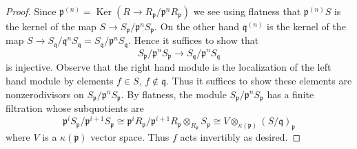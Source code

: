 \documentclass[10pt,a4paper]{amsart}
\theoremstyle{plain}
\theoremstyle{definition}
\theoremstyle{remark}
\numberwithin{equation}{subsection}
\def\Ker{\mathop{\mathrm{Ker}}}
\begin{document}
\begin{proof}
Since
$\mathfrak p^{(n)} = \Ker(R \to R_\mathfrak p/\mathfrak p^nR_\mathfrak p)$
we see using flatness that $\mathfrak p^{(n)} S$ is the kernel of the map
$S \to S_\mathfrak p/\mathfrak p^nS_\mathfrak p$. On the other hand
$\mathfrak q^{(n)}$ is the kernel of the map
$S \to S_\mathfrak q/\mathfrak q^nS_\mathfrak q =
S_\mathfrak q/\mathfrak p^nS_\mathfrak q$. Hence it suffices
to show that
$$
S_\mathfrak p/\mathfrak p^nS_\mathfrak p
\longrightarrow
S_\mathfrak q/\mathfrak p^nS_\mathfrak q
$$
is injective. Observe that the right hand module is the localization
of the left hand module by elements $f \in S$, $f \not \in \mathfrak q$.
Thus it suffices to show these elements are nonzerodivisors on
$S_\mathfrak p/\mathfrak p^nS_\mathfrak p$. By flatness, the module
$S_\mathfrak p/\mathfrak p^nS_\mathfrak p$ has a finite filtration whose
subquotients are
$$
\mathfrak p^iS_\mathfrak p/\mathfrak p^{i + 1}S_\mathfrak p
\cong \mathfrak p^iR_\mathfrak p/\mathfrak p^{i + 1}R_\mathfrak p
\otimes_{R_\mathfrak p} S_\mathfrak p \cong
V \otimes_{\kappa(\mathfrak p)} (S/\mathfrak q)_\mathfrak p
$$
where $V$ is a $\kappa(\mathfrak p)$ vector space. Thus $f$
acts invertibly as desired.
\end{proof}
\end{document}
